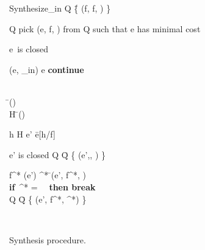  \begin{figure}[!t]
{\small 
\begin{algorithm}{Synthesize}{\E_{in}} 
Q \= \{ (f, f, \E) \}   \qquad {}    \\
\begin{WHILE}{Q \ne \emptyset}
      \textrm{pick }(e, f, \E) \textrm{ from }Q \textrm{ such
        that }e\textrm{ has minimal cost}\\
      \begin{IF}{e~\textrm{is closed}}
           \begin{IF}{(e, \E_{in})} 
                  \RETURN e 
            \ELSE \textbf{continue}
           \end{IF} 
       \end{IF}\\
      \tau \= (\E) \\
      H \= (\tau) \\
      \begin{FOR}{h \in H}   
           e' \= e[h/f] \\
           \begin{IF}{e' \textrm{is closed}}    
              Q \= Q \cup \{ (e',\bot , \emptyset)  \} 
	      \ELSE 
	        \begin{FOR}{f^* \in {}(e')}
                \E^* \= (e', f^*, \E) \\
                \textbf{if}~\E^* = \ \perp~\textbf{then break} \\
                Q \= Q \cup \{ (e', f^*, \E^*) \} 
             \end{FOR}
           \end{IF}
       \end{FOR}
\end{WHILE} \\
\RETURN \perp
\end{algorithm}
} 
\vspace{-0.2in}
\caption{Synthesis procedure. %
  }
   \label{fig:algorithm}
\vspace{-0.1in}
 \end{figure}

